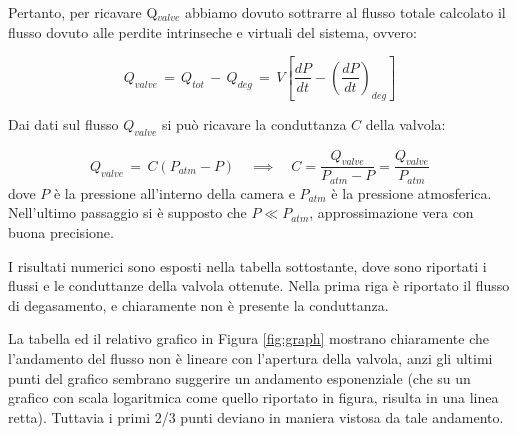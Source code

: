 Pertanto, per ricavare Q$_{valve}$ abbiamo dovuto sottrarre al flusso totale calcolato il flusso  dovuto alle perdite intrinseche e virtuali del sistema, ovvero:

\begin{equation}
	Q_{valve} \, = \, Q_{tot} \, - \, Q_{deg} \, = \, V \left[ \frac{dP}{dt} - \left(\frac{dP}{dt}\right)_{deg} \right]
\end{equation}

Dai dati sul flusso $Q_{valve}$ si può ricavare la conduttanza $C$ della valvola:

\begin{equation}
	Q_{valve} \, = \, C (P_{atm} - P) \quad \implies \quad C = \frac{Q_{valve}}{P_{atm} - P} = \frac{Q_{valve}}{P_{atm}}
\end{equation}
%
dove $P$ è la pressione all'interno della camera e $P_{atm}$ è la pressione atmosferica. Nell'ultimo passaggio si è supposto
che $P \ll P_{atm}$, approssimazione vera con buona precisione.

I risultati numerici sono esposti nella tabella sottostante, dove sono riportati i flussi e le conduttanze della valvola ottenute.
Nella prima riga è riportato il flusso di degasamento, e chiaramente non è presente la conduttanza.



La tabella ed il relativo grafico in Figura \ref{fig:graph} mostrano chiaramente che l'andamento del flusso non è lineare con
l'apertura della valvola, anzi gli ultimi punti del grafico sembrano suggerire un andamento esponenziale (che su un grafico
con scala logaritmica come quello riportato in figura, risulta in una linea retta). Tuttavia i primi 2/3
punti deviano in maniera vistosa da tale andamento.
